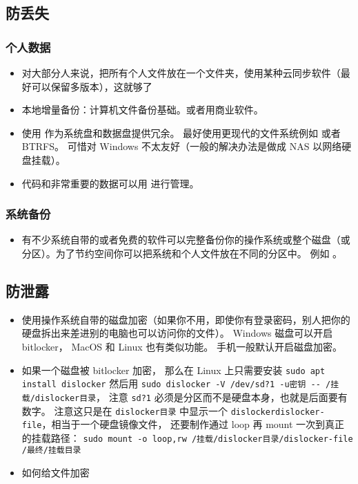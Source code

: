 
\begin{issues}
\issueDraft
\end{issues}

\subsection{防丢失}
\subsubsection{个人数据}
\begin{itemize}
\item 对大部分人来说，把所有个人文件放在一个文件夹，使用某种云同步软件（最好可以保留多版本），这就够了
\item 本地增量备份：计算机文件备份基础。或者用商业软件。
\item 使用  作为系统盘和数据盘提供冗余。 最好使用更现代的文件系统例如  或者 BTRFS。 可惜对 Windows 不太友好（一般的解决办法是做成 NAS 以网络硬盘挂载）。
\item 代码和非常重要的数据可以用   进行管理。
\end{itemize}

\subsubsection{系统备份}
\begin{itemize}
\item 有不少系统自带的或者免费的软件可以完整备份你的操作系统或整个磁盘（或分区）。为了节约空间你可以把系统和个人文件放在不同的分区中。 例如 。
\end{itemize}

\subsection{防泄露}
\begin{itemize}
\item 使用操作系统自带的磁盘加密（如果你不用，即使你有登录密码，别人把你的硬盘拆出来差进别的电脑也可以访问你的文件）。 Windows 磁盘可以开启 bitlocker， MacOS 和 Linux 也有类似功能。 手机一般默认开启磁盘加密。
\item 如果一个磁盘被 bitlocker 加密， 那么在 Linux 上只需要安装 \verb`sudo apt install dislocker` 然后用 \verb`sudo dislocker -V /dev/sd?1 -u密钥 -- /挂载/dislocker目录`， 注意 \verb`sd?1` 必须是分区而不是硬盘本身，也就是后面要有数字。  注意这只是在 \verb`dislocker目录` 中显示一个 \verb`dislockerdislocker-file`，相当于一个硬盘镜像文件， 还要制作通过 loop 再 mount 一次到真正的挂载路径： \verb`sudo mount -o loop,rw /挂载/dislocker目录/dislocker-file /最终/挂载目录`
\item 如何给文件加密
\end{itemize}
